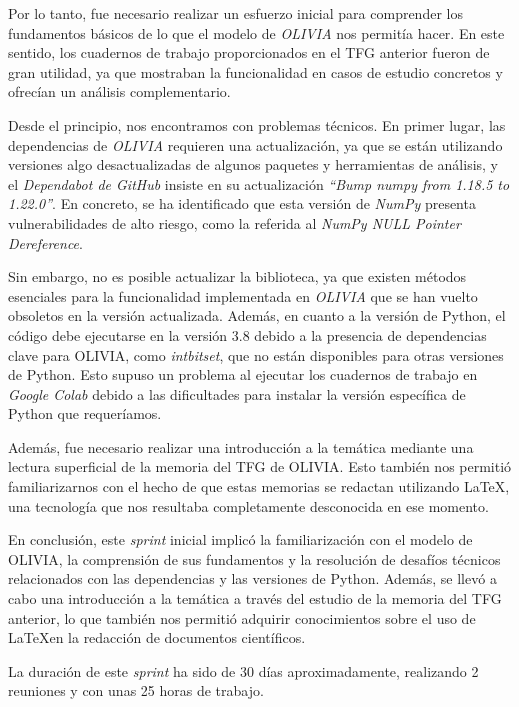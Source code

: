 Por lo tanto, fue necesario realizar un esfuerzo inicial para comprender los fundamentos básicos de lo que el modelo 
de \textit{OLIVIA} nos permitía hacer. En este sentido, los cuadernos de trabajo proporcionados en el TFG anterior fueron de 
gran utilidad, ya que mostraban la funcionalidad en casos de estudio concretos y ofrecían un análisis complementario.

Desde el principio, nos encontramos con problemas técnicos. En primer lugar, las dependencias de \textit{OLIVIA} requieren una 
actualización, ya que se están utilizando versiones algo desactualizadas de algunos paquetes y herramientas de análisis, 
y el \textit{Dependabot de GitHub} insiste en su actualización \textit{``Bump numpy from 1.18.5 to 1.22.0''}. En concreto, 
se ha identificado que esta versión de \textit{NumPy} presenta vulnerabilidades de alto riesgo, como la referida al 
\textit{NumPy NULL Pointer Dereference}.

Sin embargo, no es posible actualizar la biblioteca, ya que existen métodos esenciales para la funcionalidad 
implementada en \textit{OLIVIA} que se han vuelto obsoletos en la versión actualizada. Además, en cuanto a la versión de Python, 
el código debe ejecutarse en la versión 3.8 debido a la presencia de dependencias clave para OLIVIA, como \textit{intbitset}, 
que no están disponibles para otras versiones de Python. Esto supuso un problema al ejecutar los cuadernos de trabajo 
en \textit{Google Colab} debido a las dificultades para instalar la versión específica de Python que requeríamos.

Además, fue necesario realizar una introducción a la temática mediante una lectura superficial de la memoria del 
TFG de OLIVIA. Esto también nos permitió familiarizarnos con el hecho de que estas memorias se redactan 
utilizando \LaTeX, una tecnología que nos resultaba completamente desconocida en ese momento.

En conclusión, este \textit{sprint} inicial implicó la familiarización con el modelo de OLIVIA, la comprensión de 
sus fundamentos y la resolución de desafíos técnicos relacionados con las dependencias y las versiones de Python. 
Además, se llevó a cabo una introducción a la temática a través del estudio de la memoria del TFG anterior, lo que 
también nos permitió adquirir conocimientos sobre el uso de \LaTeX en la redacción de documentos científicos.

La duración de este \textit{sprint} ha sido de 30 días aproximadamente, realizando 2 reuniones y 
con unas 25 horas de trabajo.

